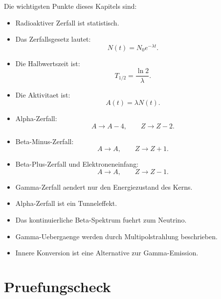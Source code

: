 \begin{notebox}
Die wichtigsten Punkte dieses Kapitels sind:
\begin{itemize}
    \item Radioaktiver Zerfall ist statistisch.
    \item Das Zerfallsgesetz lautet:
    \[
        N(t)=N_0e^{-\lambda t}.
    \]
    \item Die Halbwertszeit ist:
    \[
        T_{1/2}=\frac{\ln 2}{\lambda}.
    \]
    \item Die Aktivitaet ist:
    \[
        A(t)=\lambda N(t).
    \]
    \item Alpha-Zerfall:
    \[
        A\rightarrow A-4,
        \qquad
        Z\rightarrow Z-2.
    \]
    \item Beta-Minus-Zerfall:
    \[
        A\rightarrow A,
        \qquad
        Z\rightarrow Z+1.
    \]
    \item Beta-Plus-Zerfall und Elektroneneinfang:
    \[
        A\rightarrow A,
        \qquad
        Z\rightarrow Z-1.
    \]
    \item Gamma-Zerfall aendert nur den Energiezustand des Kerns.
    \item Alpha-Zerfall ist ein Tunneleffekt.
    \item Das kontinuierliche Beta-Spektrum fuehrt zum Neutrino.
    \item Gamma-Uebergaenge werden durch Multipolstrahlung beschrieben.
    \item Innere Konversion ist eine Alternative zur Gamma-Emission.
\end{itemize}
\end{notebox}

\section{Pruefungscheck}

